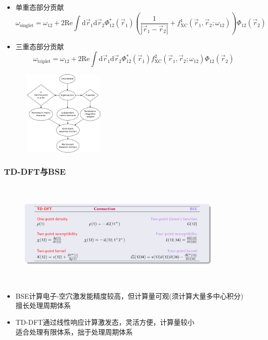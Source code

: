 {{{{\begin{itemize}
	\item 单重态部分贡献
		\begin{displaymath}
			\omega_{\mathrm{singlet}}=\omega_{12}+2\mathrm{Re}\int\mathrm{d}\vec r_1\mathrm{d}\vec r_2\Phi_{12}^{\ast}(\vec r_1)\left(\frac1{|\vec r_1-\vec r_2|}+f_{\mathrm{XC}}^1(\vec r_1,\vec r_2;\omega_{12})\right)\Phi_{12}(\vec r_2)
		\end{displaymath}
	\item 三重态部分贡献
		\begin{displaymath}
			\omega_{\mathrm{triplet}}=\omega_{12}+2\mathrm{Re}\int\mathrm{d}\vec r_1\mathrm{d}\vec r_2\Phi_{12}^{\ast}(\vec r_1)f_{\mathrm{XC}}^2(\vec r_1,\vec r_2;\omega_{12})\Phi_{12}(\vec r_2)
		\end{displaymath}
\end{itemize} }}
\begin{figure}[h!]
\centering
\vspace{-10pt}
\includegraphics[height=1.65in,width=1.70in,viewport=0 0 1200 1300,clip]{Figures/lr-TDDFT_flowchart.png}
\label{lr-DFT-flowchart}
\end{figure}
}

\frame
{
	\frametitle{\textrm{TD-DFT}与\textrm{BSE}}
\begin{figure}[h!]
\centering
\vspace{-50pt}
\includegraphics[height=2.05in,width=4.00in,viewport=50 0 1450 730,clip]{Figures/DFT_GW_BSE-compare.png}
\label{DFTGW-BSE_compare}
\end{figure}
\begin{itemize}
	\item \textrm{BSE}计算电子-空穴激发能精度较高，但计算量可观(须计算大量多中心积分)\\
		擅长处理周期体系
	\item \textrm{TD-DFT}通过线性响应计算激发态，灵活方便，计算量较小\\
		适合处理有限体系，拙于处理周期体系
\end{itemize}
}

}
